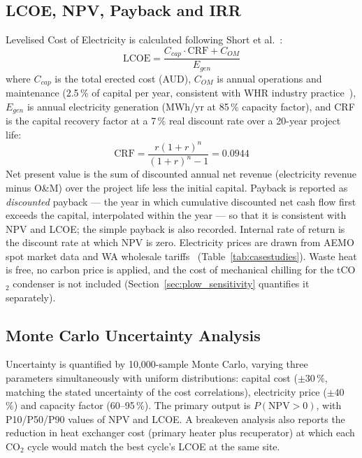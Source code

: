 \documentclass[12pt,a4paper]{report}
\begin{document}
\subsection{LCOE, NPV, Payback and IRR}

Levelised Cost of Electricity is calculated following Short et
al.~\cite{Short1995}:
\begin{equation}
\mathrm{LCOE} = \frac{C_{cap} \cdot \mathrm{CRF} + C_{OM}}{E_{gen}}
\label{eq:lcoe}
\end{equation}
where $C_{cap}$ is the total erected cost (AUD), $C_{OM}$ is annual
operations and maintenance (2.5\,\% of capital per year, consistent with WHR
industry practice~\cite{Baglietto2023}), $E_{gen}$ is annual electricity
generation (MWh/yr at 85\,\% capacity factor), and CRF is the capital
recovery factor at a 7\,\% real discount rate over a 20-year project life:
\begin{equation}
\mathrm{CRF} = \frac{r(1+r)^n}{(1+r)^n - 1} = 0.0944
\label{eq:crf}
\end{equation}
Net present value is the sum of discounted annual net revenue (electricity
revenue minus O\&M) over the project life less the initial capital. Payback
is reported as \emph{discounted} payback --- the year in which cumulative
discounted net cash flow first exceeds the capital, interpolated within the
year --- so that it is consistent with NPV and LCOE; the simple payback is
also recorded. Internal rate of return is the discount rate at which NPV is
zero. Electricity prices are drawn from AEMO spot market data and WA
wholesale tariffs~\cite{AEMO2024} (Table~\ref{tab:casestudies}). Waste heat
is free, no carbon price is applied, and the cost of mechanical chilling for
the tCO$_2$ condenser is not included (Section~\ref{sec:plow_sensitivity}
quantifies it separately).

\subsection{Monte Carlo Uncertainty Analysis}

Uncertainty is quantified by 10,000-sample Monte Carlo, varying three
parameters simultaneously with uniform distributions: capital cost
($\pm 30$\,\%, matching the stated uncertainty of the cost correlations),
electricity price ($\pm 40$\,\%) and capacity factor (60--95\,\%). The
primary output is $P(\mathrm{NPV} > 0)$, with P10/P50/P90 values of NPV and
LCOE. A breakeven analysis also reports the reduction in heat exchanger cost
(primary heater plus recuperator) at which each CO$_2$ cycle would match the
best cycle's LCOE at the same site.
\end{document}
